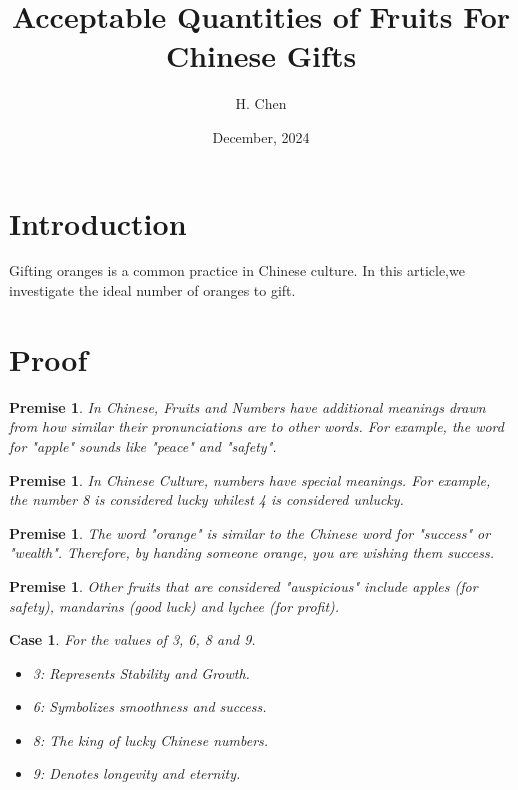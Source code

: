 \documentclass[10pt,a4paper]{article}
\newtheorem{premise}[theorem]{Premise}
\newtheorem{case}[theorem]{Case}
\begin{document}
\title{Acceptable Quantities of Fruits For Chinese Gifts}
\author{H. Chen}
\date{December, 2024}
\maketitle

\section{Introduction}
Gifting oranges is a common practice in Chinese culture. In this article,we investigate the ideal number of oranges to gift.

\section{Proof}
\begin{premise}
    In Chinese, Fruits and Numbers have additional meanings drawn from how similar their pronunciations are to other words. For example, the word for "apple" sounds like "peace" and "safety".
\end{premise}

\begin{premise}
    In Chinese Culture, numbers have special meanings. For example, the number 8 is considered lucky whilest 4 is considered unlucky.
\end{premise}

\begin{premise}
    The word "orange" is similar to the Chinese word for "success" or "wealth". Therefore, by handing someone orange, you are wishing them success.
\end{premise}

\begin{premise}
    Other fruits that are considered "auspicious" include apples (for safety), mandarins (good luck) and lychee (for profit).
\end{premise}

\begin{case}
    For the values of 3, 6, 8 and 9.

    \begin{itemize}
        \item 3: Represents Stability and Growth. 
        \item 6: Symbolizes smoothness and success.
        \item 8: The king of lucky Chinese numbers.
        \item 9: Denotes longevity and eternity.
    \end{itemize}

\end{case}
\end{document}
